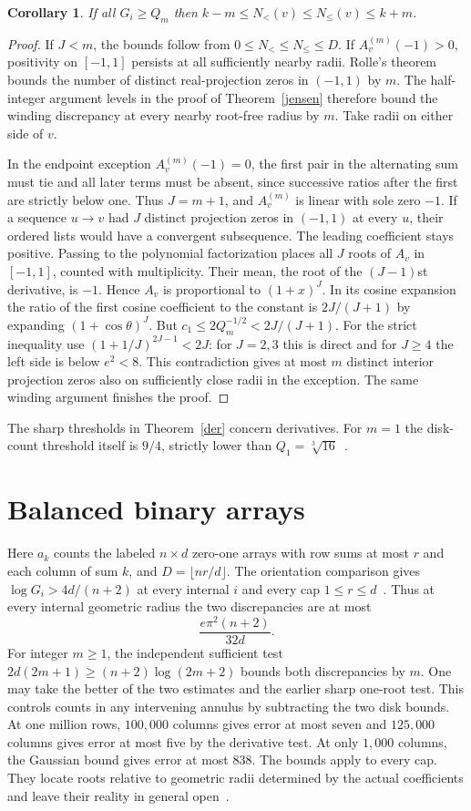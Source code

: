 \documentclass[11pt]{article}
\newtheorem{corollary}[theorem]{Corollary}
\begin{document}
\begin{corollary}\label{integer}
If all $G_i\ge Q_m$ then $k-m\le N_{<}(v)\le N_{\le}(v)\le k+m$.
\end{corollary}
\begin{proof}
If $J<m$, the bounds follow from $0\le N_{<}\le N_{\le}\le D$. If $A_v^{(m)}(-1)>0$, positivity on $[-1,1]$ persists at all sufficiently nearby radii. Rolle's theorem bounds the number of distinct real-projection zeros in $(-1,1)$ by $m$. The half-integer argument levels in the proof of Theorem~\ref{jensen} therefore bound the winding discrepancy at every nearby root-free radius by $m$. Take radii on either side of $v$.

In the endpoint exception $A_v^{(m)}(-1)=0$, the first pair in the alternating sum must tie and all later terms must be absent, since successive ratios after the first are strictly below one. Thus $J=m+1$, and $A_v^{(m)}$ is linear with sole zero $-1$. If a sequence $u\to v$ had $J$ distinct projection zeros in $(-1,1)$ at every $u$, their ordered lists would have a convergent subsequence. The leading coefficient stays positive. Passing to the polynomial factorization places all $J$ roots of $A_v$ in $[-1,1]$, counted with multiplicity. Their mean, the root of the $(J-1)$st derivative, is $-1$. Hence $A_v$ is proportional to $(1+x)^J$. In its cosine expansion the ratio of the first cosine coefficient to the constant is $2J/(J+1)$ by expanding $(1+\cos\theta)^J$. But $c_1\le2Q_m^{-1/2}<2J/(J+1)$. For the strict inequality use $(1+1/J)^{2J-1}<2J$: for $J=2,3$ this is direct and for $J\ge4$ the left side is below $e^2<8$. This contradiction gives at most $m$ distinct interior projection zeros also on sufficiently close radii in the exception. The same winding argument finishes the proof.
\end{proof}
The sharp thresholds in Theorem~\ref{der} concern derivatives. For $m=1$ the disk-count threshold itself is $9/4$, strictly lower than $Q_1=\sqrt[3]{16}$~\cite{single}.

\section*{Balanced binary arrays}
Here $a_k$ counts the labeled $n\times d$ zero-one arrays with row sums at most $r$ and each column of sum $k$, and $D=\lfloor nr/d\rfloor$. The orientation comparison gives $\log G_i>4d/(n+2)$ at every internal $i$ and every cap $1\le r\le d$~\cite{orientation}. Thus at every internal geometric radius the two discrepancies are at most
\[
 \frac{e\pi^2(n+2)}{32d}.
\]
For integer $m\ge1$, the independent sufficient test $2d(2m+1)\ge(n+2)\log(2m+2)$ bounds both discrepancies by $m$. One may take the better of the two estimates and the earlier sharp one-root test. This controls counts in any intervening annulus by subtracting the two disk bounds. At one million rows, $100{,}000$ columns gives error at most seven and $125{,}000$ columns gives error at most five by the derivative test. At only $1{,}000$ columns, the Gaussian bound gives error at most 838. The bounds apply to every cap. They locate roots relative to geometric radii determined by the actual coefficients and leave their reality in general open~\cite{alex}.
\end{document}
